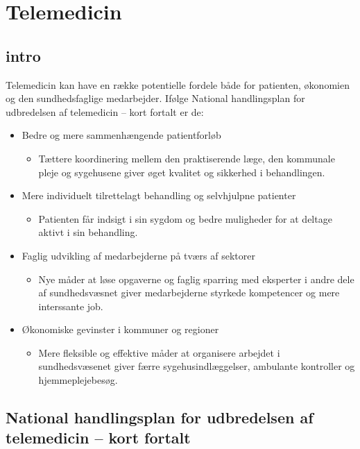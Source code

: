 \section{Telemedicin}

\subsection{intro}
Telemedicin kan have en række potentielle fordele både for patienten, økonomien og den sundhedsfaglige medarbejder. Ifølge National handlingsplan for udbredelsen af telemedicin – kort fortalt \cite{Regeringen2012} er de:

\begin{itemize} 
	\item Bedre og mere sammenhængende patientforløb
		\begin{itemize} 

			\item Tættere koordinering mellem den praktiserende læge, den kommunale pleje og sygehusene giver øget kvalitet og sikkerhed i behandlingen.

		\end{itemize} 

	\item Mere individuelt tilrettelagt behandling og selvhjulpne patienter
		\begin{itemize} 

			\item Patienten får indsigt i sin sygdom og bedre muligheder for at deltage aktivt i sin behandling.

		\end{itemize} 

	\item Faglig udvikling af medarbejderne på tværs af sektorer
		\begin{itemize} 

			\item Nye måder at løse opgaverne og faglig sparring med eksperter i andre dele af sundhedsvæsnet giver medarbejderne styrkede kompetencer og mere interssante job.

		\end{itemize} 

	\item Økonomiske gevinster i kommuner og regioner
		\begin{itemize} 

			\item Mere fleksible og effektive måder at organisere arbejdet i sundhedsvæsenet giver færre sygehusindlæggelser, ambulante kontroller og hjemmeplejebesøg.

		\end{itemize} 	
\end{itemize} 

\subsection{National handlingsplan for udbredelsen af telemedicin – kort fortalt}
 